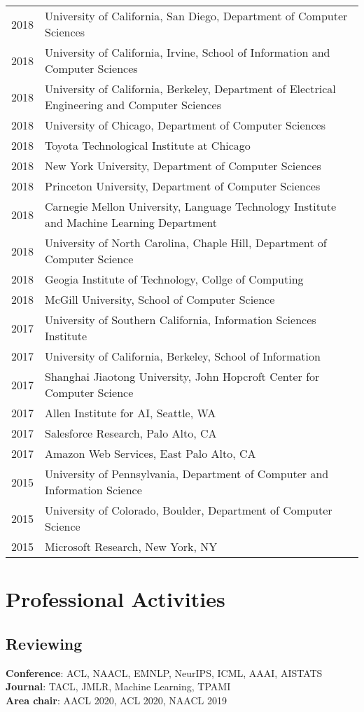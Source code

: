 \documentclass[a4paper,11pt]{article}
\begin{document}
\begin{longtable}{rl}
    2018 & University of California, San Diego, Department of Computer Sciences \\
    2018 & University of California, Irvine, School of Information and Computer Sciences \\
    2018 & University of California, Berkeley, Department of Electrical Engineering and Computer Sciences \\
    2018 & University of Chicago, Department of Computer Sciences \\
    2018 & Toyota Technological Institute at Chicago \\
    2018 & New York University, Department of Computer Sciences \\
    2018 & Princeton University, Department of Computer Sciences \\
    2018 & Carnegie Mellon University, Language Technology Institute and Machine Learning Department \\
    2018 & University of North Carolina, Chaple Hill, Department of Computer Science \\
    2018 & Geogia Institute of Technology, Collge of Computing \\
    2018 & McGill University, School of Computer Science \\
    2017 & University of Southern California, Information Sciences Institute \\
    2017 & University of California, Berkeley, School of Information \\
    2017 & Shanghai Jiaotong University, John Hopcroft Center for Computer Science \\
    2017 & Allen Institute for AI, Seattle, WA \\
    2017 & Salesforce Research, Palo Alto, CA \\
    2017 & Amazon Web Services, East Palo Alto, CA \\
    2015 & University of Pennsylvania, Department of Computer and Information Science \\
    2015 & University of Colorado, Boulder, Department of Computer Science \\
    2015 & Microsoft Research, New York, NY \\
\end{longtable}

\section{Professional Activities}
\subsection{Reviewing}
\textbf{Conference}: ACL, NAACL, EMNLP, NeurIPS, ICML, AAAI, AISTATS \\
\textbf{Journal}: TACL, JMLR, Machine Learning, TPAMI \\
\textbf{Area chair}: AACL 2020, ACL 2020, NAACL 2019
\end{document}
